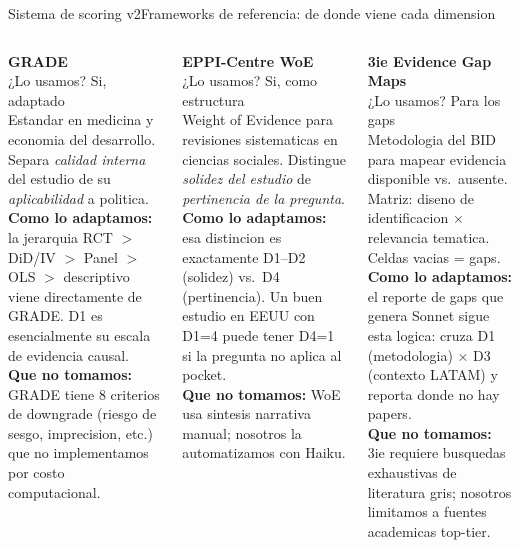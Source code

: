 \documentclass[aspectratio=169,10pt]{beamer}
\newenvironment{card}[1][cardbg]{%
  \begin{tcolorbox}[colback=#1,colframe=bidlight!40,arc=4pt,
    boxrule=0.4pt,left=5pt,right=5pt,top=4pt,bottom=4pt]}%
  {\end{tcolorbox}}
\begin{document}
\begin{frame}{Sistema de scoring v2}{Frameworks de referencia: de donde viene cada dimension}
\begin{columns}[T]
\begin{card}
\small\textbf{\color{bidaccent}GRADE}\\
{\tiny\color{bidaccent!60}¿Lo usamos? Si, adaptado}\\[4pt]
\scriptsize\color{bidgray}
Estandar en medicina y economia del desarrollo. Separa \emph{calidad interna} del estudio de su \emph{aplicabilidad} a politica.\\[4pt]
\textbf{Como lo adaptamos:} la jerarquia RCT $>$ DiD/IV $>$ Panel $>$ OLS $>$ descriptivo viene directamente de GRADE. D1 es esencialmente su escala de evidencia causal.\\[4pt]
\textbf{Que no tomamos:} GRADE tiene 8 criterios de downgrade (riesgo de sesgo, imprecision, etc.) que no implementamos por costo computacional.
\end{card}

\begin{card}
\small\textbf{\color{bidaccent}EPPI-Centre WoE}\\
{\tiny\color{bidaccent!60}¿Lo usamos? Si, como estructura}\\[4pt]
\scriptsize\color{bidgray}
Weight of Evidence para revisiones sistematicas en ciencias sociales. Distingue \emph{solidez del estudio} de \emph{pertinencia de la pregunta}.\\[4pt]
\textbf{Como lo adaptamos:} esa distincion es exactamente D1--D2 (solidez) vs.\ D4 (pertinencia). Un buen estudio en EEUU con D1=4 puede tener D4=1 si la pregunta no aplica al pocket.\\[4pt]
\textbf{Que no tomamos:} WoE usa sintesis narrativa manual; nosotros la automatizamos con Haiku.
\end{card}

\begin{card}
\small\textbf{\color{bidaccent}3ie Evidence Gap Maps}\\
{\tiny\color{bidaccent!60}¿Lo usamos? Para los gaps}\\[4pt]
\scriptsize\color{bidgray}
Metodologia del BID para mapear evidencia disponible vs.\ ausente. Matriz: diseno de identificacion × relevancia tematica. Celdas vacias = gaps.\\[4pt]
\textbf{Como lo adaptamos:} el reporte de gaps que genera Sonnet sigue esta logica: cruza D1 (metodologia) × D3 (contexto LATAM) y reporta donde no hay papers.\\[4pt]
\textbf{Que no tomamos:} 3ie requiere busquedas exhaustivas de literatura gris; nosotros limitamos a fuentes academicas top-tier.
\end{card}
\end{columns}


\end{frame}
\end{document}
